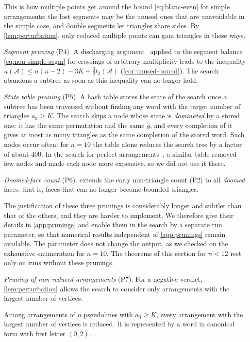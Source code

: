 This is how multiple points get around the bound \eqref{eq:blanc-even} for simple arrangements: the lost segments may be the unused ones that are unavoidable in the simple case, and double segments let triangles share sides. By \cref{lem:perturbation}, only reduced multiple points can gain triangles in these ways.

\emph{Segment pruning} (P4). A discharging argument~\cite{cw17} applied to the segment balance \eqref{eq:non-simple-segm} for crossings of arbitrary multiplicity leads to the inequality $u(\mathcal{A})\le n(n-2)-3K+\tfrac32t_3(\mathcal{A})$ (\cref{cor:unused-bound}). The search abandons a subtree as soon as this inequality can no longer hold.

\emph{State table pruning} (P5). A hash table stores the state of the search once a subtree has been traversed without finding any word with the target number of triangles $a_3\geq K$. The search skips a node whose state is \emph{dominated} by a stored one: it has the same permutation and the same $\widehat g$, and every completion of it gives at most as many triangles as the same completion of the stored word. Such nodes occur often: for $n=10$ the table alone reduces the search tree by a factor of about 400. In the search for perfect arrangements~\cite[Section~4]{pu26b}, a similar table removed few nodes and made each node more expensive, so we did not use it there.

\emph{Doomed-face count} (P6).  extends the early non-triangle count (P2) to all \emph{doomed} faces, that is, faces that can no longer become bounded triangles.

The justification of these three prunings is considerably longer and subtler than that of the others, and they are harder to implement.
We therefore give their details in \cref{app:prunings} and enable them in the search by a separate run parameter, so that numerical results independent of \cref{app:prunings} remain available.
The parameter does not change the output, as we checked on the exhaustive enumeration for $n=10$.
The theorems of this section for $n<12$ rest only on runs without these prunings.

\emph{Pruning of non-reduced arrangements} (P7). For a negative verdict, \cref{lem:perturbation} allows the search to consider only arrangements with the largest number of vertices.

\begin{corollary}\label{cor:reduced}
Among arrangements of $n$ pseudolines with $a_3\ge K$, every arrangement with the largest number of vertices is reduced.
It is represented by a word in canonical form with first letter $(0,2)$.
\end{corollary}

